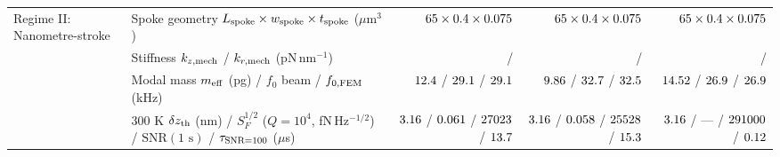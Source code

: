 \begin{table}[!htbp]
{\begin{tabular}{llrrr}
\midrule
\multirow{7}{*}{Regime II: Nanometre-stroke} 
 & Spoke geometry $L_{\rm spoke} \times w_{\rm spoke} \times t_{\rm spoke}$ ($\mu$m$^3$) & $65{} \times 0.4{} \times 0.075{}$ & $65{} \times 0.4{} \times 0.075{}$ & $65{} \times 0.4{} \times 0.075{}$ \\
 & Stiffness $k_{z,\rm mech}$ / $k_{r,\rm mech}$ (pN\,nm$^{-1}$) & \NatureRotCeightCompactNtwoLateralStabilityNmActuatorKZMechPnPerNm{} / \NatureRotCeightCompactNtwoLateralStabilityNmActuatorKRMechPnPerNm{} & \NatureRotCeightCompactNtwoLateralStabilityNmActuatorKZMechPnPerNm{} / \NatureRotCeightCompactNtwoLateralStabilityNmActuatorKRMechPnPerNm{} & \NatureRotCeightCompactNtwoLateralStabilityNmActuatorKZMechPnPerNm{} / \NatureRotCeightCompactNtwoLateralStabilityNmActuatorKRMechPnPerNm{} \\
 & Modal mass $m_{\rm eff}$ (pg) / $f_0$ beam / $f_{0,\rm FEM}$ (kHz) & $\roundtwo{\NatureCantorNtwoHybridrzMEffRegtwoPg}$ / $\roundone{\NatureCantorNtwoHybridrzResFreqRegimeTwoKhz}$ / $\roundone{\NatureCantorNtwoHybridrzFemFreqRegtwoKhz}$ & $\roundtwo{\NatureRotCeightCompactNtwoMEffRegtwoPg}$ / $\roundone{\NatureRotCeightCompactNtwoResFreqRegimeTwoKhz}$ / $\roundone{\NatureRotCeightCompactNtwoFemFreqRegtwoKhz}$ & $\roundtwo{\NatureFthreeOneoneoneMEffRegtwoPg}$ / $\roundone{\NatureFthreeOneoneoneFZeroRegtwoKhz}$ / $\roundone{\NatureFthreeOneoneoneFemFreqRegtwoKhz}$ \\
 & 300 K $\delta z_{\rm th}$ (nm) / $S_F^{1/2}$ ($Q=10^4$, fN\,Hz$^{-1/2}$) / $\mathrm{SNR}(1\text{ s})$ / $\tau_{\rm SNR=100}$ ($\mu$s) & $\roundtwo{\NatureCantorNtwoHybridrzThermalDzRegimeTwoNm}$ / $\roundthree{\NatureCantorNtwoHybridrzSfSqrtRegtwoQoneefourFn}$ / $\roundzero{\NatureCantorNtwoHybridrzSnrOneSecRegtwo}$ / $\roundone{\NatureCantorNtwoHybridrzTauSnronezerozeroRegtwoQoneefourUs}$ & $\roundtwo{\NatureRotCeightCompactNtwoThermalDzRegimeTwoNm}$ / $\roundthree{\NatureRotCeightCompactNtwoSfSqrtRegtwoQoneefourFn}$ / $\roundzero{\NatureRotCeightCompactNtwoSnrOneSecRegtwo}$ / $\roundone{\NatureRotCeightCompactNtwoTauSnronezerozeroRegtwoQoneefourUs}$ & $\roundtwo{\NatureCantorNtwoHybridrzThermalDzRegimeTwoNm}$ / --- / $\roundzero{\NatureFthreeOneoneoneSnrOneSecRegtwoQoneefour}$ / $\roundtwo{\NatureFthreeOneoneoneTauSnronezerozeroRegtwoQoneefourUs}$ \\

\end{tabular}}
\end{table}
